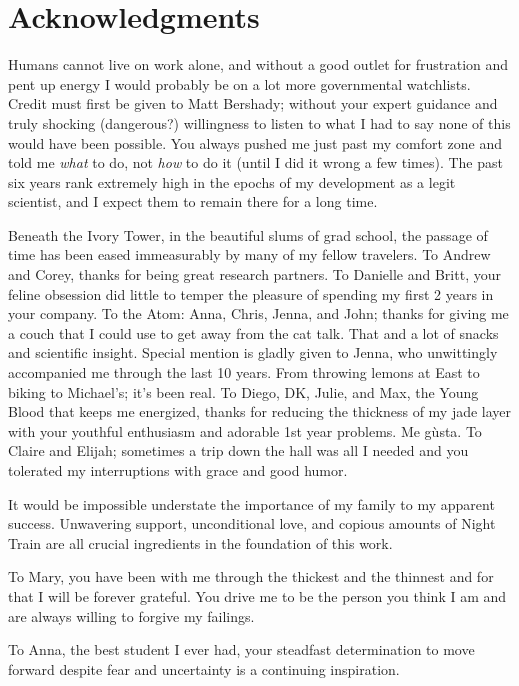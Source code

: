 \chapter*{Acknowledgments}

Humans cannot live on work alone, and without a good outlet for
frustration and pent up energy I would probably be on a lot more
governmental watchlists. Credit must first be given to Matt Bershady;
without your expert guidance and truly shocking (dangerous?)
willingness to listen to what I had to say none of this would have
been possible. You always pushed me just past my comfort zone and told
me \emph{what} to do, not \emph{how} to do it (until I did it wrong a
few times). The past six years rank extremely high in the epochs of my
development as a legit scientist, and I expect them to remain there
for a long time.

Beneath the Ivory Tower, in the beautiful slums of grad school, the
passage of time has been eased immeasurably by many of my fellow
travelers. To Andrew and Corey, thanks for being great research
partners. To Danielle and Britt, your feline obsession did little to
temper the pleasure of spending my first 2 years in your company. To
the Atom: Anna, Chris, Jenna, and John; thanks for giving me a couch
that I could use to get away from the cat talk. That and a lot of
snacks and scientific insight. Special mention is gladly given to
Jenna, who unwittingly accompanied me through the last 10 years. From
throwing lemons at East to biking to Michael's; it's been real. To
Diego, DK, Julie, and Max, the Young Blood that keeps me energized,
thanks for reducing the thickness of my jade layer with your youthful
enthusiasm and adorable 1st year problems. Me g\`usta. To Claire and
Elijah; sometimes a trip down the hall was all I needed and you
tolerated my interruptions with grace and good humor.

It would be impossible understate the importance of my family to my
apparent success. Unwavering support, unconditional love, and copious
amounts of Night Train are all crucial ingredients in the foundation
of this work.

To Mary, you have been with me through the thickest and the thinnest
and for that I will be forever grateful. You drive me to be the person
you think I am and are always willing to forgive my failings.

To Anna, the best student I ever had, your steadfast determination to
move forward despite fear and uncertainty is a continuing inspiration.

